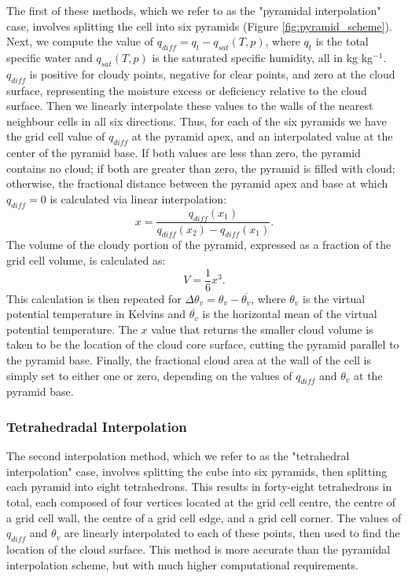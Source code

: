 \documentclass[12pt]{article}
\begin{document}
The first of these methods, which we refer to as the "pyramidal interpolation" 
case, involves splitting the cell into six pyramids  
(Figure \ref{fig:pyramid_scheme}).  Next, we compute the value of 
$q_{diff} = q_t - q_{sat}(T, p)$, where $q_t$ is the total specific water and
$q_{sat}(T, p)$ is the saturated specific humidity, all in kg kg$^{-1}$.  
$q_{diff}$ is positive for cloudy points, negative for clear points, and zero 
at the cloud surface, representing the moisture excess or deficiency relative 
to the cloud surface.  Then we linearly interpolate these values to the walls 
of the nearest neighbour cells in all six directions.  Thus, for each of the 
six pyramids we have the grid cell value of $q_{diff}$ at the pyramid apex, and
an interpolated value at the center of the pyramid base. If both values are 
less than zero, the pyramid contains no cloud; if both are greater than zero, 
the pyramid is filled with cloud; otherwise, the fractional distance between 
the pyramid apex and base at which $q_{diff} = 0$ is calculated via linear 
interpolation:
\begin{equation}
\label{eq:q_diff_interpolation}
x = \frac{q_{diff}(x_1)}{q_{diff}(x_2) - q_{diff}(x_1)}.
\end{equation}
The volume of the cloudy portion of the pyramid, expressed as a fraction of the 
grid cell volume, is calculated as:
\begin{equation}
V = \frac{1}{6}x^3.
\end{equation}
This calculation is then repeated for $\Delta\theta_v = \theta_v - 
\overline{\theta_v}$, where $\theta_v$ is the virtual potential temperature in 
Kelvins and $\overline{\theta_v}$ is the horizontal mean of the virtual 
potential temperature.  The $x$ value that returns the smaller cloud volume is 
taken to be the location of the cloud core surface, cutting the pyramid 
parallel to the pyramid base.  Finally, the fractional cloud area at the wall 
of the cell is simply set to either one or zero, depending on the values of 
$q_{diff}$ and $\theta_v$ at the pyramid base.


\subsubsection{Tetrahedradal Interpolation}

The second interpolation method, which we refer to as the "tetrahedral 
interpolation" case, involves splitting the cube into six pyramids, then 
splitting each pyramid into eight tetrahedrons. This results in forty-eight 
tetrahedrons in total, each composed of four vertices located at the grid cell 
centre, the centre of a grid cell wall, the centre of a grid cell edge, and 
a grid cell corner.  The values of $q_{diff}$ and $\theta_v$ are linearly 
interpolated to each of these points, then used to find the location of the 
cloud surface.  This method is more accurate than the pyramidal interpolation 
scheme, but with much higher computational requirements.
\end{document}
